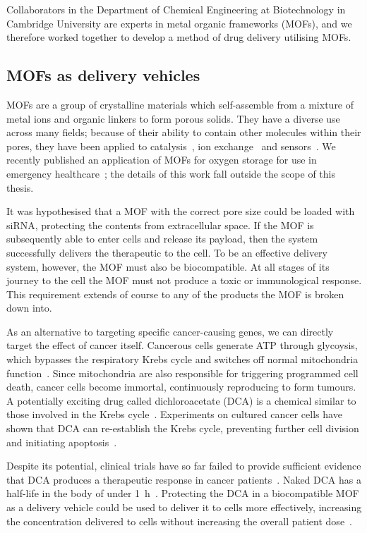 Collaborators in the Department of Chemical Engineering at Biotechnology in Cambridge University are experts in metal organic frameworks (MOFs), and we therefore worked together to develop a method of drug delivery utilising MOFs.


\subsection{MOFs as delivery vehicles}
MOFs are a group of crystalline materials which self-assemble from a mixture of metal ions and organic linkers to form porous solids. 
They have a diverse use across many fields; because of their ability to contain other molecules within their pores, they have been applied to catalysis~\cite{ma2009enantioselective, farrusseng2011metal}, ion exchange~\cite{custelcean2007anion, fei2010reversible} and sensors~\cite{kreno2011metal, miller2016metal}. 
We recently published an application of MOFs for oxygen storage for use in emergency healthcare~\cite{moghadam2018computer}; the details of this work fall outside the scope of this thesis. 

It was hypothesised that a MOF with the correct pore size could be loaded with siRNA, protecting the contents from extracellular space. 
If the MOF is subsequently able to enter cells and release its payload, then the system successfully delivers the therapeutic to the cell. 
To be an effective delivery system, however, the MOF must also be biocompatible.
At all stages of its journey to the cell the MOF must not produce a toxic or immunological response. 
This requirement extends of course to any of the products the MOF is broken down into. 

As an alternative to targeting specific cancer-causing genes, we can directly target the effect of cancer itself. 
Cancerous cells generate ATP through glycoysis, which bypasses the respiratory Krebs cycle and switches off normal mitochondria function~\cite{murray1993cell, warburg1930uber}. 
Since mitochondria are also responsible for triggering programmed cell death, cancer cells become immortal, continuously reproducing to form tumours. 
A potentially exciting drug called dichloroacetate (DCA) is a chemical similar to those involved in the Krebs cycle~\cite{michelakis2008dichloroacetate, matsuhashi2015activation}. 
Experiments on cultured cancer cells have shown that DCA can re-establish the Krebs cycle, preventing further cell division and initiating apoptosis~\cite{bonnet2007mitochondria}. 

Despite its potential, clinical trials have so far failed to provide sufficient evidence that DCA produces a therapeutic response in cancer patients~\cite{michelakis2010metabolic}. 
Naked DCA has a half-life in the body of under \SI{1}{\hour}~\cite{michelakis2008dichloroacetate}. 
Protecting the DCA in a biocompatible MOF as a delivery vehicle could be used to deliver it to cells more effectively, increasing the concentration delivered to cells without increasing the overall patient dose~\cite{abanades2018mechanistic}. 

